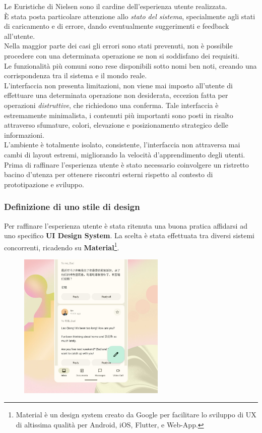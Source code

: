 \documentclass{natourDoc}
\begin{document}
Le Euristiche di Nielsen sono il cardine dell'esperienza utente realizzata. \\
È stata posta particolare attenzione allo \textit{stato del sistema}, specialmente agli stati di caricamento e di errore,
dando eventualmente suggerimenti e feedback all'utente. \\
Nella maggior parte dei casi gli errori sono stati prevenuti, non è possibile procedere con una determinata operazione se non si soddisfano
dei requisiti. \\
Le funzionalità più comuni sono rese disponibili sotto nomi ben noti, creando una corrispondenza tra il sistema e il mondo reale. \\
L'interfaccia non presenta limitazioni, non viene mai imposto all'utente di effettuare una determinata operazione non desiderata,
eccezion fatta per operazioni \textit{distruttive}, che richiedono una conferma.
Tale interfaccia è estremamente minimalista, i contenuti più importanti sono posti in risalto attraverso sfumature, colori, elevazione e
posizionamento strategico delle informazioni. \\
L'ambiente è totalmente isolato, consistente, l'interfaccia non attraversa mai cambi di layout estremi, migliorando la velocità d'apprendimento degli utenti. \\

Prima di raffinare l'esperienza utente è stato necessario coinvolgere un ristretto bacino d'utenza per ottenere riscontri esterni
rispetto al contesto di prototipazione e sviluppo.

\newpage

\subsubsection{Definizione di uno stile di design}
Per raffinare l'esperienza utente è stata ritenuta una buona pratica affidarsi ad uno specifico \textbf{UI Design System}.
La scelta è stata effettuata tra diversi sistemi concorrenti, ricadendo su
\textbf{Material}\footnote{Material è un design system creato da Google per facilitare lo sviluppo di UX di altissima qualità per Android, iOS, Flutter, e Web-App.}.

\FloatBarrier
\begin{figure}[htbp!]
	\centering
	\includegraphics[height=7cm]{usability/material3.jpg}
\end{figure}
\FloatBarrier
\end{document}
